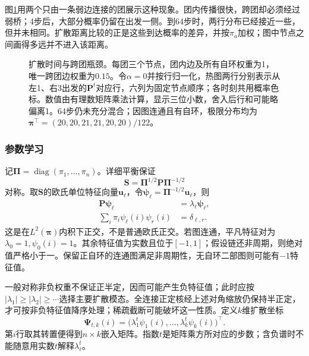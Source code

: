 图\ref{fig:dim-diffusion-walk}用两个只由一条弱边连接的团展示这种现象。团内传播很快，跨团却必须经过弱桥；4步后，大部分概率仍留在出发一侧。到64步时，两行分布已经接近一些，但并未相同。扩散距离比较的正是这些到达概率的差异，并按$\pi_a$加权；图中节点之间画得多远并不进入该距离。

\begin{figure}[htbp]
  \centering
  
  \caption{扩散时间与跨团瓶颈。每团三个节点，团内边及所有自环权重为1，唯一跨团边权重为$0.15$。令$\alpha=0$并按行归一化，热图两行分别表示从左1、右3出发的$\bm{P}^t$对应行，六列为固定节点顺序；各时刻共用概率色标。数值由有理数矩阵乘法计算，显示三位小数，舍入后行和可能略偏离1。64步仍未充分混合；因图连通且有自环，极限分布均为$\bm{\pi}^{\top}=(20,20,21,21,20,20)/122$。}
  \label{fig:dim-diffusion-walk}
\end{figure}

\subsubsection{参数学习}

记$\bm{\Pi}=\operatorname{diag}(\pi_1,\ldots,\pi_n)$。详细平衡保证
\[
  \bm{S}=\bm{\Pi}^{1/2}\bm{P}\bm{\Pi}^{-1/2}
\]
对称。取$\bm{S}$的欧氏单位特征向量$\bm{u}_\ell$，令$\bm{\psi}_\ell=\bm{\Pi}^{-1/2}\bm{u}_\ell$，则
\begin{equation}
  \label{eq:dim-diffusion-eigenvectors}
  \begin{aligned}
    \bm{P}\bm{\psi}_\ell&=\lambda_\ell\bm{\psi}_\ell,\\
    \sum_i\pi_i\psi_\ell(i)\psi_r(i)&=\delta_{\ell,r}.
  \end{aligned}
\end{equation}
这是在$L^2(\bm{\pi})$内积下正交，不是普通欧氏正交。若图连通，平凡特征对为$\lambda_0=1,\psi_0(i)=1$。其余特征值为实数且位于$[-1,1]$；假设链还非周期，则绝对值严格小于一。保留正自环的连通图满足非周期性，无自环二部图则可能有$-1$特征值。

一般对称非负权重不保证正半定，因而可能产生负特征值；此时应按$|\lambda_1|\geq|\lambda_2|\geq\cdots$选择主要扩散模态。全连接正定核经上述对角缩放仍保持半正定，才可按非负特征值降序处理；稀疏截断可能破坏这一性质。定义$k$维扩散坐标
\begin{equation}
  \label{eq:dim-diffusion-map}
  \bm{\Psi}_{t,k}(i)
  =\bigl(\lambda_1^t\psi_1(i),\ldots,
         \lambda_k^t\psi_k(i)\bigr)^{\top}.
\end{equation}
第$i$行取其转置便得到$n\times k$嵌入矩阵。指数$t$是矩阵乘方所对应的步数；含负谱时不能随意用实数$t$解释$\lambda_\ell^t$。

